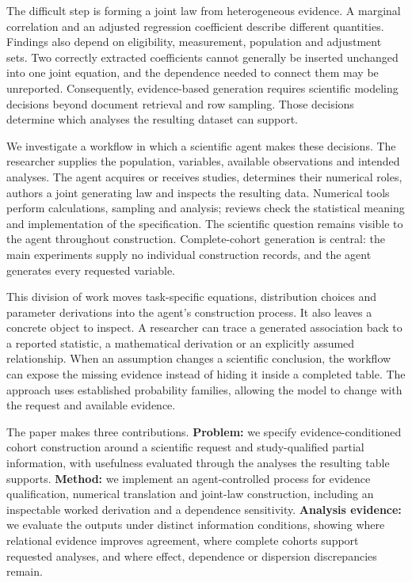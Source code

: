 \documentclass[10pt,twocolumn]{article}
\begin{document}
The difficult step is forming a joint law from heterogeneous evidence. A marginal correlation and an adjusted regression coefficient describe different quantities. Findings also depend on eligibility, measurement, population and adjustment sets. Two correctly extracted coefficients cannot generally be inserted unchanged into one joint equation, and the dependence needed to connect them may be unreported. Consequently, evidence-based generation requires scientific modeling decisions beyond document retrieval and row sampling. Those decisions determine which analyses the resulting dataset can support.


We investigate a workflow in which a scientific agent makes these decisions. The researcher supplies the population, variables, available observations and intended analyses. The agent acquires or receives studies, determines their numerical roles, authors a joint generating law and inspects the resulting data. Numerical tools perform calculations, sampling and analysis; reviews check the statistical meaning and implementation of the specification. The scientific question remains visible to the agent throughout construction. Complete-cohort generation is central: the main experiments supply no individual construction records, and the agent generates every requested variable.


This division of work moves task-specific equations, distribution choices and parameter derivations into the agent's construction process. It also leaves a concrete object to inspect. A researcher can trace a generated association back to a reported statistic, a mathematical derivation or an explicitly assumed relationship. When an assumption changes a scientific conclusion, the workflow can expose the missing evidence instead of hiding it inside a completed table. The approach uses established probability families, allowing the model to change with the request and available evidence.


The paper makes three contributions. \textbf{Problem:} we specify evidence-conditioned cohort construction around a scientific request and study-qualified partial information, with usefulness evaluated through the analyses the resulting table supports. \textbf{Method:} we implement an agent-controlled process for evidence qualification, numerical translation and joint-law construction, including an inspectable worked derivation and a dependence sensitivity. \textbf{Analysis evidence:} we evaluate the outputs under distinct information conditions, showing where relational evidence improves agreement, where complete cohorts support requested analyses, and where effect, dependence or dispersion discrepancies remain.
\end{document}
